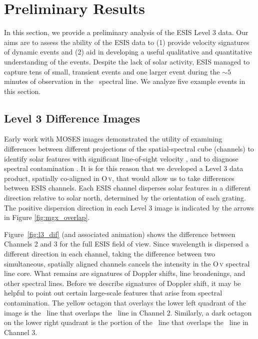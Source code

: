 \documentclass[linenumbers,trackchanges]{aastex63}
\begin{document}
\section{Preliminary Results}
 
	   In this section, we provide a preliminary analysis of the ESIS Level 3 data. Our aims are to assess the ability of the ESIS data to (1) provide velocity signatures of dynamic events and (2) aid in developing a useful qualitative and quantitative understanding of the events.
	   Despite the lack of solar activity, ESIS managed to capture tens of small, transient events and one larger event during the $\sim 5$ minutes of observation in the \ov \ spectral line.  
	   We analyze five example events in this section.  
	   
    \subsection{Level 3 Difference Images} \label{sec:dif_images} 
    	Early work with MOSES images demonstrated the utility of examining differences between different projections of the spatial-spectral cube (channels) to identify solar features with significant line-of-sight velocity \citep{Fox2010,Fox2011,Rust2017,Rust2019}, and to diagnose spectral contamination \citep{Rust2017, Rust2019}.
    	It is for this reason that we developed a Level 3 data product, spatially co-aligned in O\,\textsc{v}, that would allow us to take differences between ESIS channels.
    	Each ESIS channel disperses solar features in a different direction relative to solar north, determined by the orientation of each grating.
    	The positive dispersion direction in each Level 3 image is indicated by the arrows in Figure \ref{fig:mgx_overlap}.

    	Figure~\ref{fig:l3_dif} (and associated animation) shows the difference between Channels 2 and 3 for the full ESIS field of view.  
    	Since wavelength is dispersed a different direction in each channel, taking the difference between two
    	simultaneous, spatially aligned channels cancels the intensity in the O\,\textsc{v} spectral line core. 
    	What remains are signatures of Doppler shifts, line broadenings, and other spectral lines.
    	Before we describe signatures of Doppler shift, it may be helpful to point out certain large-scale features that arise from spectral contamination.
    	The yellow octagon that overlays the lower left quadrant of the image is the \mgxbright \ line that overlaps the \ov \ line in Channel 2. Similarly, a dark octagon on the lower right quadrant is the portion of the \mgxbright \ line that overlaps the \ov \ line in Channel 3.
    	
\end{document}
